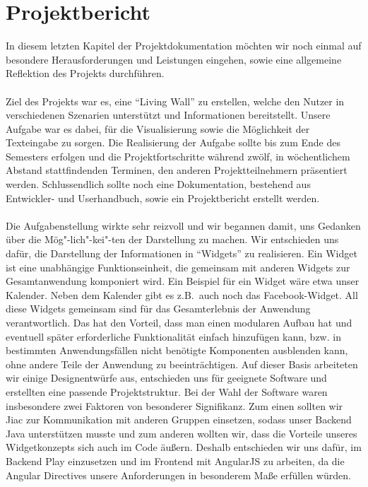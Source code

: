 \documentclass[10pt,a4paper]{report}
\begin{document}
\chapter{Projektbericht}
	In diesem letzten Kapitel der Projektdokumentation möchten wir noch einmal auf besondere Herausforderungen und Leistungen eingehen, sowie eine allgemeine Reflektion des Projekts durchführen.\\\\
	Ziel des Projekts war es, eine "`Living Wall"' zu erstellen, welche den Nutzer in verschiedenen Szenarien unterstützt und Informationen bereitstellt. Unsere Aufgabe war es dabei, für die Visualisierung sowie die Möglichkeit der Texteingabe zu sorgen. Die Realisierung der Aufgabe sollte bis zum Ende des Semesters erfolgen und die Projektfortschritte während zwölf, in wöchentlichem Abstand stattfindenden Terminen, den anderen Projektteilnehmern präsentiert werden. Schlussendlich sollte noch eine Dokumentation, bestehend aus Entwickler- und Userhandbuch, sowie ein Projektbericht erstellt werden.\\\\
	Die Aufgabenstellung wirkte sehr reizvoll und wir begannen damit, uns Gedanken über die Mög"-lich"-kei"-ten der Darstellung zu machen. Wir entschieden uns dafür, die Darstellung der Informationen in "`Widgets"' zu realisieren. Ein Widget ist eine unabhängige Funktionseinheit, die gemeinsam mit anderen Widgets zur Gesamtanwendung komponiert wird. Ein Beispiel für ein Widget wäre etwa unser Kalender. Neben dem Kalender gibt es z.B.~auch noch das Facebook-Widget. All diese Widgets gemeinsam sind für das Gesamterlebnis der Anwendung verantwortlich. Das hat den Vorteil, dass man einen modularen Aufbau hat und eventuell später erforderliche Funktionalität einfach hinzufügen kann, bzw. in bestimmten Anwendungsfällen nicht benötigte Komponenten ausblenden kann, ohne andere Teile der Anwendung zu beeinträchtigen. Auf dieser Basis arbeiteten wir einige Designentwürfe aus, entschieden uns für geeignete Software und erstellten eine passende Projektstruktur. Bei der Wahl der Software waren insbesondere zwei Faktoren von besonderer Signifikanz. Zum einen sollten wir Jiac zur Kommunikation mit anderen Gruppen einsetzen, sodass unser Backend Java unterstützen musste und zum anderen wollten wir, dass die Vorteile unseres Widgetkonzepts sich auch im Code äußern. Deshalb entschieden wir uns dafür, im Backend Play einzusetzen und im Frontend mit AngularJS zu arbeiten, da die Angular Directives unsere Anforderungen in besonderem Maße erfüllen würden.\\\\
\end{document}
